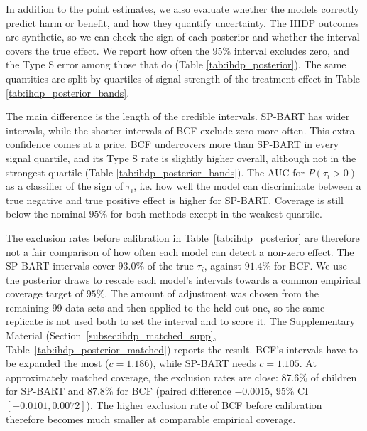 \documentclass[12pt]{article}
\newcommand{\rev}[1]{\ifdefined\ReviewChanges{\color{revisionblue}#1}\else#1\fi}
\begin{document}
In addition to the point estimates, we also evaluate whether the models correctly predict harm or benefit, and how they quantify uncertainty. The IHDP outcomes are synthetic, so we can check the sign of each posterior and whether the interval covers the true effect. We report how often the $95\%$ interval excludes zero, and the Type S error among those that do (Table \ref{tab:ihdp_posterior}). The same quantities are split by quartiles of signal strength of the treatment effect in Table \ref{tab:ihdp_posterior_bands}.

The main difference is the length of the credible intervals. \rev{SP-BART} has wider intervals, while the shorter intervals of BCF exclude zero more often. This extra confidence comes at a price. BCF undercovers more than \rev{SP-BART} in every signal quartile, and its Type S rate is slightly higher overall, although not in the strongest quartile (Table \ref{tab:ihdp_posterior_bands}). The AUC for $P(\tau_i>0)$ as a classifier of the sign of $\tau_i$, i.e. how well the model can discriminate between a true negative and true positive effect is higher for \rev{SP-BART}. Coverage is still below the nominal $95\%$ for both methods except in the weakest quartile.

The exclusion rates before calibration in Table~\ref{tab:ihdp_posterior} are therefore not a fair comparison of how often each model can detect a non-zero effect. The \rev{SP-BART} intervals cover $93.0\%$ of the true $\tau_i$, against $91.4\%$ for BCF. We use the posterior draws to rescale each model's intervals towards a common empirical coverage target of $95\%$. The amount of adjustment was chosen from the remaining 99 data sets and then applied to the held-out one, so the same replicate is not used both to set the interval and to score it. The Supplementary Material (Section~\ref{subsec:ihdp_matched_supp}, Table~\ref{tab:ihdp_posterior_matched}) reports the result. BCF's intervals have to be expanded the most ($c=1.186$), while \rev{SP-BART} needs $c=1.105$. At approximately matched coverage, the exclusion rates are close: $87.6\%$ of children for \rev{SP-BART} and $87.8\%$ for BCF (paired difference $-0.0015$, $95\%$ CI $[-0.0101,0.0072]$). The higher exclusion rate of BCF before calibration therefore becomes much smaller at comparable empirical coverage.
\end{document}
